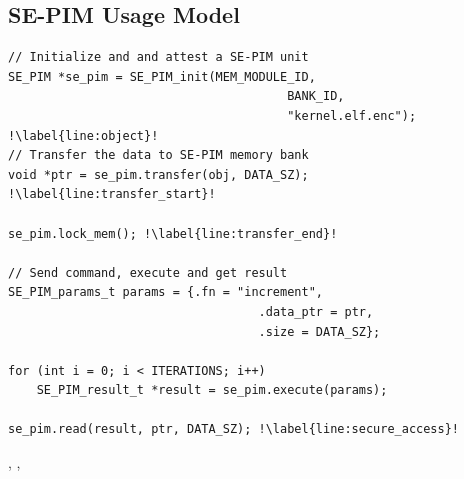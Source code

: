 
\subsection{SE-PIM Usage Model} 
\label{subsec:prog-model}
\label{subsec:accelerator-model}




    \begin{listing}[h]
    \centering
\begin{verbatim}
// Initialize and and attest a SE-PIM unit
SE_PIM *se_pim = SE_PIM_init(MEM_MODULE_ID,
                                       BANK_ID, 
                                       "kernel.elf.enc"); !\label{line:object}!
// Transfer the data to SE-PIM memory bank
void *ptr = se_pim.transfer(obj, DATA_SZ); !\label{line:transfer_start}!

se_pim.lock_mem(); !\label{line:transfer_end}!

// Send command, execute and get result
SE_PIM_params_t params = {.fn = "increment", 
                                   .data_ptr = ptr, 
                                   .size = DATA_SZ};

for (int i = 0; i < ITERATIONS; i++)
    SE_PIM_result_t *result = se_pim.execute(params);

se_pim.read(result, ptr, DATA_SZ); !\label{line:secure_access}!
\end{verbatim}
    \caption{Host-side code snippet illustrating computation offloading to \thename.},
    \label{lst:accelerator},
\end{listing}


